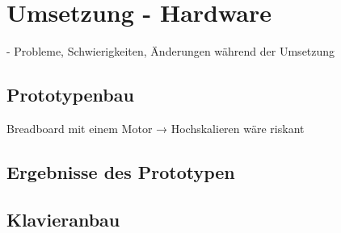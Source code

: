 
\chapter{Umsetzung - Hardware} \label{umsetzungHW}

\nocite{*}
- Probleme, Schwierigkeiten, Änderungen während der Umsetzung

\section{Prototypenbau}
Breadboard mit einem Motor → Hochskalieren wäre riskant
\section{Ergebnisse des Prototypen}
\section{Klavieranbau}
